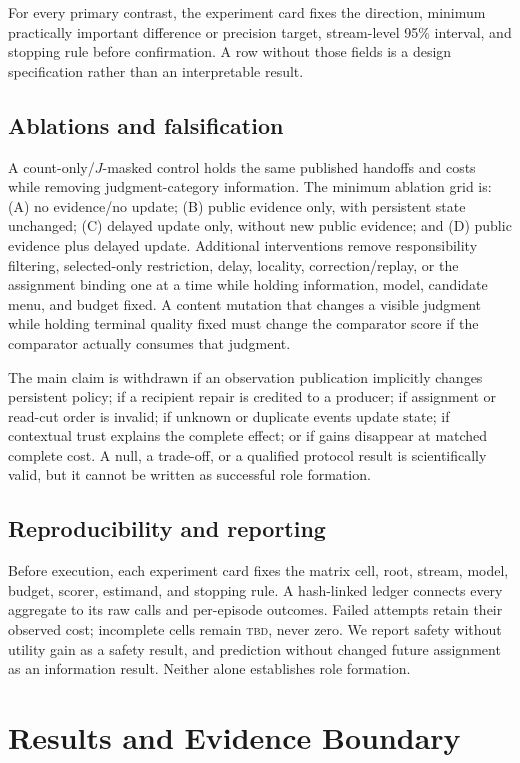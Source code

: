 \documentclass[sigconf,anonymous]{aamas}
\begin{document}
For every primary contrast, the experiment card fixes the direction, minimum practically important difference or precision target, stream-level 95\% interval, and stopping rule before confirmation. A row without those fields is a design specification rather than an interpretable result.

\subsection{Ablations and falsification}
A count-only/$J$-masked control holds the same published handoffs and costs while removing judgment-category information. The minimum ablation grid is: (A) no evidence/no update; (B) public evidence only, with persistent state unchanged; (C) delayed update only, without new public evidence; and (D) public evidence plus delayed update. Additional interventions remove responsibility filtering, selected-only restriction, delay, locality, correction/replay, or the assignment binding one at a time while holding information, model, candidate menu, and budget fixed. A content mutation that changes a visible judgment while holding terminal quality fixed must change the comparator score if the comparator actually consumes that judgment.

The main claim is withdrawn if an observation publication implicitly changes persistent policy; if a recipient repair is credited to a producer; if assignment or read-cut order is invalid; if unknown or duplicate events update state; if contextual trust explains the complete effect; or if gains disappear at matched complete cost. A null, a trade-off, or a qualified protocol result is scientifically valid, but it cannot be written as successful role formation.

\subsection{Reproducibility and reporting}
Before execution, each experiment card fixes the matrix cell, root, stream, model, budget, scorer, estimand, and stopping rule. A hash-linked ledger connects every aggregate to its raw calls and per-episode outcomes. Failed attempts retain their observed cost; incomplete cells remain \textsc{tbd}, never zero. We report safety without utility gain as a safety result, and prediction without changed future assignment as an information result. Neither alone establishes role formation.

\section{Results and Evidence Boundary}
\label{sec:current}
\end{document}
